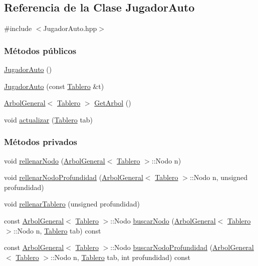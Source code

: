 \hypertarget{classJugadorAuto}{\subsection{Referencia de la Clase Jugador\-Auto}
\label{classJugadorAuto}
}


{\ttfamily \#include $<$Jugador\-Auto.\-hpp$>$}

\subsubsection*{Métodos públicos}
\begin{DoxyCompactItemize}
\item 
\hyperlink{classJugadorAuto_a28f4b4c52165488379729d71237a41a9}{Jugador\-Auto} ()
\item 
\hyperlink{classJugadorAuto_a0c2bc2690a8e6ba93b05a83b9310a03e}{Jugador\-Auto} (const \hyperlink{classTablero}{Tablero} \&t)
\item 
\hyperlink{classArbolGeneral}{Arbol\-General}$<$ \hyperlink{classTablero}{Tablero} $>$ \hyperlink{classJugadorAuto_a74531aa932becde453fe8667f6455413}{Get\-Arbol} ()
\item 
void \hyperlink{classJugadorAuto_ac1c2056f753f8f09d2acf9a72e822fb2}{actualizar} (\hyperlink{classTablero}{Tablero} tab)
\end{DoxyCompactItemize}
\subsubsection*{Métodos privados}
\begin{DoxyCompactItemize}
\item 
void \hyperlink{classJugadorAuto_ae90fa3f90f9f0357a1e04512e1352f80}{rellenar\-Nodo} (\hyperlink{classArbolGeneral}{Arbol\-General}$<$ \hyperlink{classTablero}{Tablero} $>$\-::Nodo n)
\item 
void \hyperlink{classJugadorAuto_add87179bcda9c297dfe06ca327a3de84}{rellenar\-Nodo\-Profundidad} (\hyperlink{classArbolGeneral}{Arbol\-General}$<$ \hyperlink{classTablero}{Tablero} $>$\-::Nodo n, unsigned profundidad)
\item 
void \hyperlink{classJugadorAuto_a037135d5bad9b9ce107f3d1aeb63b1df}{rellenar\-Tablero} (unsigned profundidad)
\item 
const \hyperlink{classArbolGeneral}{Arbol\-General}$<$ \hyperlink{classTablero}{Tablero} $>$\-::Nodo \hyperlink{classJugadorAuto_ace20f5c31c291f99491df06b356ae37d}{buscar\-Nodo} (\hyperlink{classArbolGeneral}{Arbol\-General}$<$ \hyperlink{classTablero}{Tablero} $>$\-::Nodo n, \hyperlink{classTablero}{Tablero} tab) const 
\item 
const \hyperlink{classArbolGeneral}{Arbol\-General}$<$ \hyperlink{classTablero}{Tablero} $>$\-::Nodo \hyperlink{classJugadorAuto_aeeda871eb999ffc3e9d4a87cdcc01e7d}{buscar\-Nodo\-Profundidad} (\hyperlink{classArbolGeneral}{Arbol\-General}$<$ \hyperlink{classTablero}{Tablero} $>$\-::Nodo n, \hyperlink{classTablero}{Tablero} tab, int profundidad) const 
\end{DoxyCompactItemize}
